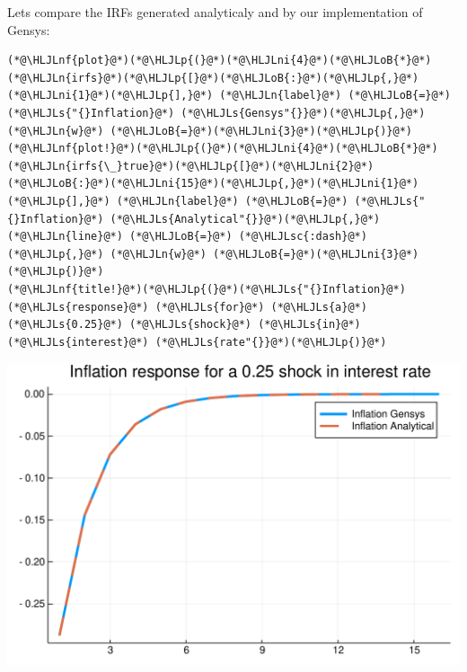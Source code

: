 \documentclass[12pt,a4paper]{article}
\newcommand{\HLJLn}[1]{#1}
\newcommand{\HLJLnf}[1]{\textcolor[RGB]{66,102,213}{#1}}
\newcommand{\HLJLs}[1]{\textcolor[RGB]{201,61,57}{#1}}
\newcommand{\HLJLsc}[1]{\textcolor[RGB]{201,61,57}{#1}}
\newcommand{\HLJLni}[1]{\textcolor[RGB]{59,151,46}{#1}}
\newcommand{\HLJLoB}[1]{\textcolor[RGB]{102,102,102}{\textbf{#1}}}
\newcommand{\HLJLp}[1]{#1}
\begin{document}
Lets compare the IRFs generated analyticaly and by our implementation of Gensys:


\begin{lstlisting}
(*@\HLJLnf{plot}@*)(*@\HLJLp{(}@*)(*@\HLJLni{4}@*)(*@\HLJLoB{*}@*)(*@\HLJLn{irfs}@*)(*@\HLJLp{[}@*)(*@\HLJLoB{:}@*)(*@\HLJLp{,}@*)(*@\HLJLni{1}@*)(*@\HLJLp{],}@*) (*@\HLJLn{label}@*) (*@\HLJLoB{=}@*) (*@\HLJLs{"{}Inflation}@*) (*@\HLJLs{Gensys"{}}@*)(*@\HLJLp{,}@*) (*@\HLJLn{w}@*) (*@\HLJLoB{=}@*)(*@\HLJLni{3}@*)(*@\HLJLp{)}@*)
(*@\HLJLnf{plot!}@*)(*@\HLJLp{(}@*)(*@\HLJLni{4}@*)(*@\HLJLoB{*}@*)(*@\HLJLn{irfs{\_}true}@*)(*@\HLJLp{[}@*)(*@\HLJLni{2}@*)(*@\HLJLoB{:}@*)(*@\HLJLni{15}@*)(*@\HLJLp{,}@*)(*@\HLJLni{1}@*)(*@\HLJLp{],}@*) (*@\HLJLn{label}@*) (*@\HLJLoB{=}@*) (*@\HLJLs{"{}Inflation}@*) (*@\HLJLs{Analytical"{}}@*)(*@\HLJLp{,}@*) (*@\HLJLn{line}@*) (*@\HLJLoB{=}@*) (*@\HLJLsc{:dash}@*)(*@\HLJLp{,}@*) (*@\HLJLn{w}@*) (*@\HLJLoB{=}@*)(*@\HLJLni{3}@*)(*@\HLJLp{)}@*)
(*@\HLJLnf{title!}@*)(*@\HLJLp{(}@*)(*@\HLJLs{"{}Inflation}@*) (*@\HLJLs{response}@*) (*@\HLJLs{for}@*) (*@\HLJLs{a}@*) (*@\HLJLs{0.25}@*) (*@\HLJLs{shock}@*) (*@\HLJLs{in}@*) (*@\HLJLs{interest}@*) (*@\HLJLs{rate"{}}@*)(*@\HLJLp{)}@*)
\end{lstlisting}

\includegraphics[width=\linewidth]{figures/gensys_11_1.pdf}
\end{document}
